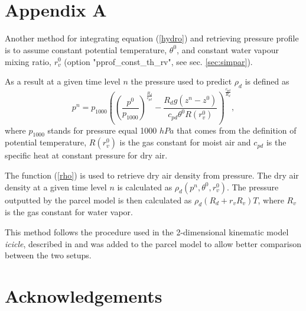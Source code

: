 \documentclass[11pt]{article}
\begin{document}
\appendix


\section*{\\Appendix A} \label{App:AppendixA}

Another method for integrating equation (\ref{hydro}) and retrieving pressure profile is to
assume constant potential temperature, $\theta^0$, and constant water vapour mixing ratio, $r_v^0$ (option "pprof\_const\_th\_rv", see sec. \ref{sec:simpar}).

  As a result at a given time level $n$ the pressure used to predict $\rho_d$ is defined as
  \begin{equation*}
    p^n = p_{1000} \left( (\frac{p^0}{p_{1000}})^{\frac{R_d}{c_{pd}}} - \frac{R_d g (z^n - z^0)}{c_{pd} \theta^{0} R(r_v^0)} \right) ^ {\frac{c_{pd}}{R_d}} ,
  \end{equation*}
  \noindent
  where $p_{1000}$ stands for pressure equal 1000 $hPa$ that comes from the definition of potential temperature,
        $R(r_v^0)$ is the gas constant for moist air and
        $c_{pd}$ is the specific heat at constant pressure for dry air.

The function (\ref{rho}) is used to retrieve dry air density from pressure. The dry air density at a given time level $n$ is calculated as $\rho_d(p^n, \theta^0, r_v^0)$.
The pressure outputted by the parcel model is then calculated as $ \rho_d  (R_d + r_v R_v)  T$,
  where $R_v$ is the gas constant for water vapor.

This method follows the procedure used in the 2-dimensional kinematic model \emph{icicle}, 
  described in \citep{Arabas_et_al_2015} and was added to the parcel model to allow better comparison 
  between the two setups.



\section*{Acknowledgements}
\footnotesize


\end{document}
